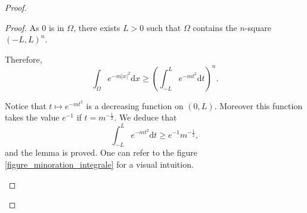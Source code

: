 \documentclass[12pt,reqno]{amsart}		%
\theoremstyle{plain}
\theoremstyle{definition}
\theoremstyle{remark}
\numberwithin{equation}{section}
\newcommand{\N}{\mathbb{N}}
\newcommand{\R}{\mathbb{R}}
\renewcommand{\d}{\mathrm{d}}
\begin{document}
\begin{proof}
\begin{proof}
	As $0$ is in $\Omega$, there exists $L>0$ such that $\Omega$ contains the $n$-square $(-L,L)^n$.
	
	Therefore,
	\begin{equation*}
	\int_{\Omega} e^{-m|x|^2}\d x
	\geqslant
	\left(\int_{-L}^L e^{-m t^2} \d t\right)^n.
	\end{equation*}
	
Notice that $t\mapsto e^{-mt^2}$ is a decreasing function on $(0,L)$. Moreover this function takes the value $e^{-1}$ if $t=m^{-\frac{1}{2}}$. We deduce that
	\begin{equation*}
	\int_{-L}^L e^{-m t^2} \d t \geqslant e^{-1} m^{-\frac{1}{2}},
	\end{equation*}
	and the lemma is proved. One can refer to the figure \ref{figure_minoration_integrale} for a visual intuition.
	
\begin{center}
\def\svgscale{0.7}

\end{center}
	
\end{proof}



	






\end{proof}
\end{document}
